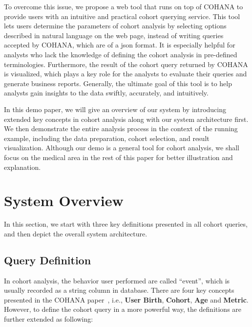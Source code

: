 To overcome this issue, we propose a web tool that runs on top of COHANA to provide users with an intuitive and practical cohort querying service. 
This tool lets users determine the parameters of cohort analysis by selecting options described in natural language on the web page, instead of writing queries accepted by COHANA, which are of a json format.  
It is especially helpful for analysts who lack the knowledge of defining the cohort analysis in pre-defined terminologies.%
Furthermore, the result of the cohort query returned by COHANA is visualized,
which plays a key role for the analysts to evaluate their queries and generate business reports.
Generally, the ultimate goal of this tool is to help analysts gain insights to the data swiftly, accurately, and intuitively.

In this demo paper, we will give an overview of our system by introducing extended key concepts in cohort analysis along with our system architecture first. We then demonstrate the entire analysis process in the context of the running example, including the data preparation, cohort selection, and result visualization.
Although our demo is a general tool for cohort analysis, we shall focus on the medical area in the rest of this paper for better illustration and explanation.

\section{System Overview}
In this section, we start with three key definitions presented in all cohort queries, and then depict the overall system architecture.  

\subsection{Query Definition}
In cohort analysis, the behavior user performed are called ``event'', which is usually recorded as a string column in database. 
There are four key concepts presented in the COHANA paper~\cite{jiang2016cohort}, i.e., \textbf{User Birth}, \textbf{Cohort}, \textbf{Age} and \textbf{Metric}.
However, to define the cohort query in a more powerful way, the definitions are further extended as following:

